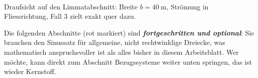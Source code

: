 \documentclass[addpoints,11pt,a4paper]{exam}
\begin{document}
\begin{questions}
\begin{groupbox}
\begin{center}
\\[-0.1em]
{\scriptsize Draufsicht auf den Limmatabschnitt: Breite $b=\SI{40}{\meter}$,
Strömung in Fliessrichtung, Fall 3 zielt exakt quer dazu.}
\end{center}
\end{groupbox}
\end{questions}

%
\iffalse
\begin{hinweisbox}
Die folgenden Abschnitte (rot markiert) sind \textbf{\emph{fortgeschritten
und optional}}: Sie brauchen den Sinussatz für allgemeine, nicht
rechtwinklige Dreiecke, was mathematisch anspruchsvoller ist als alles
bisher in diesem Arbeitsblatt. Wer möchte, kann direkt zum Abschnitt
\glqq Bezugssysteme\grqq{} weiter unten springen, das ist wieder
Kernstoff.
\end{hinweisbox}
\end{document}
